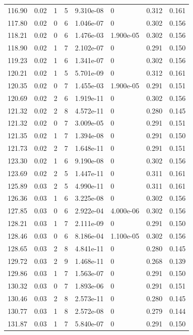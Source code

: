 \documentclass[preview]{standalone}
\begin{document}
{{{{{\begin{tabular}{L{1.2cm}C{1.2cm} C{0.3cm}C{0.5cm} C{1.4cm}C{1.4cm} C{1.4cm}C{1.4cm}}
  116.90  &  0.02  & 1     &  5 &  9.310e-08  & 0  & 0.312 &  0.161   \\ 
  117.80  &  0.02  & 0     &  6 &  1.046e-07  & 0  & 0.302 &  0.156   \\ 
  118.21  &  0.02  & 0     &  6 &  1.476e-03  & 1.900e-05  & 0.302 &  0.156   \\ 
  118.90  &  0.02  & 1     &  7 &  2.102e-07  & 0  & 0.291 &  0.150   \\ 
  119.23  &  0.02  & 1     &  6 &  1.341e-07  & 0  & 0.302 &  0.156   \\ 
  120.21  &  0.02  & 1     &  5 &  5.701e-09  & 0  & 0.312 &  0.161   \\ 
  120.35  &  0.02  & 0     &  7 &  1.455e-03  & 1.900e-05  & 0.291 &  0.151   \\ 
  120.69  &  0.02  & 2     &  6 &  1.919e-11  & 0  & 0.302 &  0.156   \\ 
  121.32  &  0.02  & 2     &  8 &  4.572e-11  & 0  & 0.280 &  0.145   \\ 
  121.32  &  0.02  & 0     &  7 &  3.009e-05  & 0  & 0.291 &  0.151   \\ 
  121.35  &  0.02  & 1     &  7 &  1.394e-08  & 0  & 0.291 &  0.150   \\ 
  121.73  &  0.02  & 2     &  7 &  1.648e-11  & 0  & 0.291 &  0.151   \\ 
  123.30  &  0.02  & 1     &  6 &  9.190e-08  & 0  & 0.302 &  0.156   \\ 
  123.69  &  0.02  & 2     &  5 &  1.447e-11  & 0  & 0.311 &  0.161   \\ 
  125.89  &  0.03  & 2     &  5 &  4.990e-11  & 0  & 0.311 &  0.161   \\ 
  126.36  &  0.03  & 1     &  6 &  3.225e-08  & 0  & 0.302 &  0.156   \\ 
  127.85  &  0.03  & 0     &  6 &  2.922e-04  & 4.000e-06  & 0.302 &  0.156   \\ 
  128.21  &  0.03  & 1     &  7 &  2.111e-09  & 0  & 0.291 &  0.150   \\ 
  128.46  &  0.03  & 0     &  6 &  8.186e-04  & 1.100e-05  & 0.302 &  0.156   \\ 
  128.65  &  0.03  & 2     &  8 &  4.841e-11  & 0  & 0.280 &  0.145   \\ 
  129.72  &  0.03  & 2     &  9 &  1.468e-11  & 0  & 0.268 &  0.139   \\ 
  129.86  &  0.03  & 1     &  7 &  1.563e-07  & 0  & 0.291 &  0.150   \\ 
  130.32  &  0.03  & 0     &  7 &  1.893e-06  & 0  & 0.291 &  0.151   \\ 
  130.46  &  0.03  & 2     &  8 &  2.573e-11  & 0  & 0.280 &  0.145   \\ 
  130.77  &  0.03  & 1     &  8 &  2.572e-08  & 0  & 0.279 &  0.144   \\ 
  131.87  &  0.03  & 1     &  7 &  5.840e-07  & 0  & 0.291 &  0.150   \\ 
\hline 
\end{tabular} 

}}}}}
\end{document}

